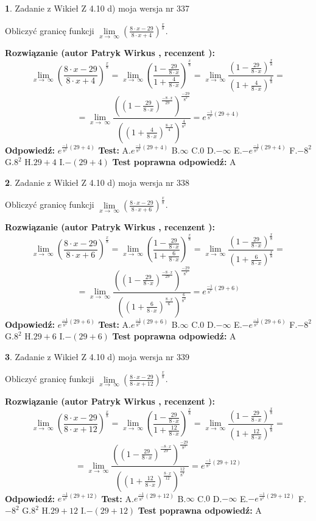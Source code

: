 \documentclass[12pt, a4paper]{article}
\theoremstyle{definition} %
\newtheorem{zad}{}
\newcommand{\zadStart}[1]{\begin{zad}#1\newline}
\newcommand{\zadStop}{\end{zad}}
\newcommand{\rozwStart}[2]{\noindent \textbf{Rozwiązanie (autor #1 , recenzent #2): }\newline}
\newcommand{\rozwStop}{\newline}
\newcommand{\odpStart}{\noindent \textbf{Odpowiedź:}\newline}
\newcommand{\odpStop}{\newline}
\newcommand{\testStart}{\noindent \textbf{Test:}\newline}
\newcommand{\testStop}{\newline}
\newcommand{\kluczStart}{\noindent \textbf{Test poprawna odpowiedź:}\newline}
\newcommand{\kluczStop}{\newline}
\begin{document}
\zadStart{Zadanie z Wikieł Z 4.10 d) moja wersja nr 337}


Obliczyć granicę funkcji  $\lim\limits_{x\to\ \infty}(\frac{8\cdot x-29}{8\cdot x+4})^{\frac{x}{8}}$.
\zadStop
\rozwStart{Patryk Wirkus}{}
$$\lim\limits_{x\to\ \infty}(\frac{8\cdot x-29}{8\cdot x+4})^{\frac{x}{8}} = \lim\limits_{x\to\ \infty}(\frac{1-\frac{29}{8\cdot x}}{1+\frac{4}{8\cdot x}})^{\frac{x}{8}}=\lim\limits_{x\to\ \infty}\frac{(1-\frac{29}{8\cdot x})^{\frac{x}{8}}}{(1+\frac{4}{8\cdot x})^{\frac{x}{8}}}=$$
$$=\lim\limits_{x\to\ \infty}\frac{((1-\frac{29}{8\cdot x})^{\frac{-8\cdot x}{29}})^{\frac{-29}{8^{2}}}}{((1+\frac{4}{8\cdot x})^{\frac{8\cdot x}{4}})^{\frac{4}{8^{2}}}}=e^{\frac{-1}{8^{2}}(29+4)}$$
\rozwStop
\odpStart
$e^{\frac{-1}{8^{2}}(29+4)}$
\odpStop
\testStart
A.$e^{\frac{-1}{8^{2}}(29+4)}$ B.$\infty$ C.$0$ D.$-\infty$ E.$-e^{\frac{-1}{8^{2}}(29+4)}$
F.$-8^{2}$ G.$8^{2}$
H.$29+4$
I.$-(29+4)$
\testStop
\kluczStart
A
\kluczStop



\zadStart{Zadanie z Wikieł Z 4.10 d) moja wersja nr 338}


Obliczyć granicę funkcji  $\lim\limits_{x\to\ \infty}(\frac{8\cdot x-29}{8\cdot x+6})^{\frac{x}{8}}$.
\zadStop
\rozwStart{Patryk Wirkus}{}
$$\lim\limits_{x\to\ \infty}(\frac{8\cdot x-29}{8\cdot x+6})^{\frac{x}{8}} = \lim\limits_{x\to\ \infty}(\frac{1-\frac{29}{8\cdot x}}{1+\frac{6}{8\cdot x}})^{\frac{x}{8}}=\lim\limits_{x\to\ \infty}\frac{(1-\frac{29}{8\cdot x})^{\frac{x}{8}}}{(1+\frac{6}{8\cdot x})^{\frac{x}{8}}}=$$
$$=\lim\limits_{x\to\ \infty}\frac{((1-\frac{29}{8\cdot x})^{\frac{-8\cdot x}{29}})^{\frac{-29}{8^{2}}}}{((1+\frac{6}{8\cdot x})^{\frac{8\cdot x}{6}})^{\frac{6}{8^{2}}}}=e^{\frac{-1}{8^{2}}(29+6)}$$
\rozwStop
\odpStart
$e^{\frac{-1}{8^{2}}(29+6)}$
\odpStop
\testStart
A.$e^{\frac{-1}{8^{2}}(29+6)}$ B.$\infty$ C.$0$ D.$-\infty$ E.$-e^{\frac{-1}{8^{2}}(29+6)}$
F.$-8^{2}$ G.$8^{2}$
H.$29+6$
I.$-(29+6)$
\testStop
\kluczStart
A
\kluczStop



\zadStart{Zadanie z Wikieł Z 4.10 d) moja wersja nr 339}


Obliczyć granicę funkcji  $\lim\limits_{x\to\ \infty}(\frac{8\cdot x-29}{8\cdot x+12})^{\frac{x}{8}}$.
\zadStop
\rozwStart{Patryk Wirkus}{}
$$\lim\limits_{x\to\ \infty}(\frac{8\cdot x-29}{8\cdot x+12})^{\frac{x}{8}} = \lim\limits_{x\to\ \infty}(\frac{1-\frac{29}{8\cdot x}}{1+\frac{12}{8\cdot x}})^{\frac{x}{8}}=\lim\limits_{x\to\ \infty}\frac{(1-\frac{29}{8\cdot x})^{\frac{x}{8}}}{(1+\frac{12}{8\cdot x})^{\frac{x}{8}}}=$$
$$=\lim\limits_{x\to\ \infty}\frac{((1-\frac{29}{8\cdot x})^{\frac{-8\cdot x}{29}})^{\frac{-29}{8^{2}}}}{((1+\frac{12}{8\cdot x})^{\frac{8\cdot x}{12}})^{\frac{12}{8^{2}}}}=e^{\frac{-1}{8^{2}}(29+12)}$$
\rozwStop
\odpStart
$e^{\frac{-1}{8^{2}}(29+12)}$
\odpStop
\testStart
A.$e^{\frac{-1}{8^{2}}(29+12)}$ B.$\infty$ C.$0$ D.$-\infty$ E.$-e^{\frac{-1}{8^{2}}(29+12)}$
F.$-8^{2}$ G.$8^{2}$
H.$29+12$
I.$-(29+12)$
\testStop
\kluczStart
A
\kluczStop
\end{document}

